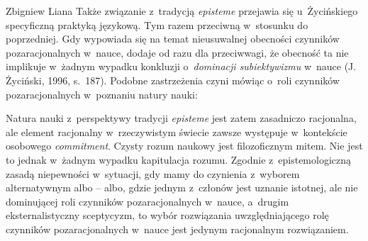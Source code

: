 \begin{artplenv}{Zbigniew Liana}
Także związanie z~tradycją \textit{episteme} przejawia się u~Życińskiego specyficzną praktyką językową. Tym razem
przeciwną w~stosunku do poprzedniej. Gdy wypowiada się na temat nieusuwalnej obecności czynników pozaracjonalnych w~nauce,
dodaje od razu  dla przeciwwagi, że obecność ta nie implikuje w~żadnym wypadku konkluzji o~\textit{dominacji
subiektywizmu} w~nauce \label{ref:RND5RKyXkJozz}(J. Życiński, 1996, s.~187). Podobne zastrzeżenia czyni  mówiąc o~roli
czynników pozaracjonalnych w~poznaniu natury nauki:


Natura nauki z~perspektywy tradycji \textit{episteme} jest zatem zasadniczo racjonalna, ale element racjonalny w~rzeczywistym
świecie zawsze występuje w~kontekście osobowego \textit{commitment}. Czysty rozum naukowy jest filozoficznym
mitem. Nie jest to jednak w~żadnym wypadku kapitulacja rozumu. Zgodnie z~epistemologiczną zasadą niepewności w~sytuacji,
gdy mamy do czynienia z~wyborem alternatywnym albo -- albo, gdzie jednym z~członów jest uznanie istotnej, ale
nie dominującej roli czynników pozaracjonalnych w~nauce, a~drugim eksternalistyczny sceptycyzm, to wybór rozwiązania
uwzględniającego rolę czynników pozaracjonalnych w~nauce jest jedynym racjonalnym rozwiązaniem.




%
%
%
%
%
%
%
%
%
%
%
%
%
%
%
%
%
%
%



\end{artplenv}
